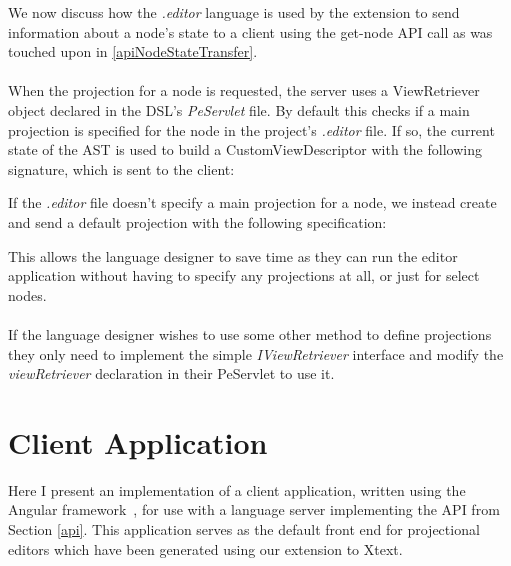 \documentclass{article}
\begin{document}
{We now discuss how the \emph{.editor} language is used by the extension to send information about a node's state to a client using the get-node API call as was touched upon in \ref{apiNodeStateTransfer}. 
\\
\\
When the projection for a node is requested, the server uses a ViewRetriever object declared in the DSL's \emph{PeServlet} file. By default this checks if a main projection is specified for the node in the project's \emph{.editor} file. If so, the current state of the AST is used to build a CustomViewDescriptor with the following signature, which is sent to the client: 

\vspace*{0.1cm}
If the \emph{.editor} file doesn't specify a main projection for a node, we instead create and send a default projection with the following specification: 

This allows the language designer to save time as they can run the editor application without having to specify any projections at all, or just for select nodes. 
\\
\\
If the language designer wishes to use some other method to define projections they only need to implement the simple \emph{IViewRetriever} interface and modify the \emph{viewRetriever} declaration in their PeServlet to use it.


\section{Client Application}\label{clientApp}
Here I present an implementation of a client application, written using the Angular framework~\cite{angular}, for use with a language server implementing the API from Section \ref{api}. This application serves as the default front end for projectional editors which have been generated using our extension to Xtext. 

}
\end{document}

